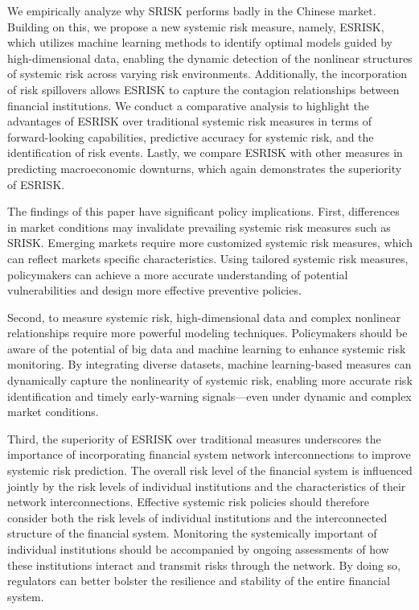 \documentclass[12pt,a4paper]{article}
\begin{document}
    We empirically analyze why SRISK performs badly in the Chinese market. Building on this, we propose a new systemic risk measure, namely, ESRISK, which utilizes machine learning methods to identify optimal models guided by high-dimensional data, enabling the dynamic detection of the nonlinear structures of systemic risk across varying risk environments. Additionally, the incorporation of risk spillovers allows ESRISK to capture the contagion relationships between financial institutions. We conduct a comparative analysis to highlight the advantages of ESRISK over traditional systemic risk measures in terms of forward-looking capabilities, predictive accuracy for systemic risk, and the identification of risk events. Lastly, we compare ESRISK with other measures in predicting macroeconomic downturns, which again demonstrates the superiority of ESRISK.

    The findings of this paper have significant policy implications. First, differences in market conditions may invalidate prevailing systemic risk measures such as SRISK. Emerging markets require more customized systemic risk measures, which can reflect markets specific characteristics. Using tailored systemic risk measures, policymakers can achieve a more accurate understanding of potential vulnerabilities and design more effective preventive policies.

    Second, to measure systemic risk, high-dimensional data and complex nonlinear relationships require more powerful modeling techniques. Policymakers should be aware of the potential of big data and machine learning to enhance systemic risk monitoring. By integrating diverse datasets, machine learning-based measures can dynamically capture the nonlinearity of systemic risk, enabling more accurate risk identification and timely early-warning signals—even under dynamic and complex market conditions.

    Third, the superiority of ESRISK over traditional measures underscores the importance of incorporating financial system network interconnections to improve systemic risk prediction. The overall risk level of the financial system is influenced jointly by the risk levels of individual institutions and the characteristics of their network interconnections. Effective systemic risk policies should therefore consider both the risk levels of individual institutions and the interconnected structure of the financial system. Monitoring the systemically important of individual institutions should be accompanied by ongoing assessments of how these institutions interact and transmit risks through the network. By doing so, regulators can better bolster the resilience and stability of the entire financial system.

    
\end{document}
